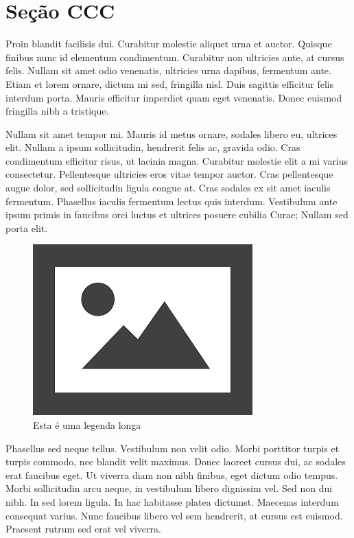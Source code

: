 \documentclass{article}
\begin{document}
	
	\section{Seção CCC}
	
	Proin blandit facilisis dui. Curabitur molestie aliquet urna et auctor. Quisque finibus nunc id elementum condimentum. Curabitur non ultricies ante, at cursus felis. Nullam sit amet odio venenatis, ultricies urna dapibus, fermentum ante. Etiam et lorem ornare, dictum mi sed, fringilla nisl. Duis sagittis efficitur felis interdum porta. Mauris efficitur imperdiet quam eget venenatis. Donec euismod fringilla nibh a tristique.
	
	Nullam sit amet tempor mi. Mauris id metus ornare, sodales libero eu, ultrices elit. Nullam a ipsum sollicitudin, hendrerit felis ac, gravida odio. Cras condimentum efficitur risus, ut lacinia magna. Curabitur molestie elit a mi varius consectetur. Pellentesque ultricies eros vitae tempor auctor. Cras pellentesque augue dolor, sed sollicitudin ligula congue at. Cras sodales ex sit amet iaculis fermentum. Phasellus iaculis fermentum lectus quis interdum. Vestibulum ante ipsum primis in faucibus orci luctus et ultrices posuere cubilia Curae; Nullam sed porta elit.
	
	\begin{figure}[H]
		\centering
		\includegraphics[width=0.3\linewidth]{Figuras/fig3}
		\caption[Legenda curta]{Esta é uma legenda longa}
		\label{fig:fig3}
	\end{figure}
	
	Phasellus sed neque tellus. Vestibulum non velit odio. Morbi porttitor turpis et turpis commodo, nec blandit velit maximus. Donec laoreet cursus dui, ac sodales erat faucibus eget. Ut viverra diam non nibh finibus, eget dictum odio tempus. Morbi sollicitudin arcu neque, in vestibulum libero dignissim vel. Sed non dui nibh. In sed lorem ligula. In hac habitasse platea dictumst. Maecenas interdum consequat varius. Nunc faucibus libero vel sem hendrerit, at cursus est euismod. Praesent rutrum sed erat vel viverra. \cite{Fitzgerald2014}
	
	\nocite{autor02}
	\nocite{autor03}
	\newpage %
	
	
\end{document}
